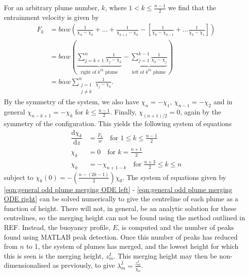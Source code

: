 \documentclass{jfm}
\newcommand{\dbyd}[2]{\dfrac{\mathrm{d} #1}{\mathrm{d}#2}} %
\begin{document}
	For an arbitrary plume number, $k$, where $1<k\leq \tfrac{n-1}{2}$ we find that the entrainment velocity is given by
	\begin{align}
	F_k &= b\alpha w \displaystyle{ \left(\frac{1}{\chi_n - \chi_k} + \dots + \frac{1}{\chi_{k+1} - \chi_k} - \left[\frac{1}{\chi_k - \chi_{k-1}} + \dots \frac{1}{\chi_k - \chi_1}\right]\right)}\\
	&= b\alpha w \left( \underbrace{\sum_{j=k+1}^{n} \frac{1}{\chi_j - \chi_k}}_{\text{right of $k^{th}$ plume}}  - \underbrace{\sum_{j=1}^{k-1}\frac{1}{\chi_k - \chi_j}}_{\text{left of $k^{th}$ plume}}\right) \label{eqn:general odd entrainment velocity} \\
	& = b\alpha w \sum_{\substack{j=1\\ j\neq k}}^{n} \frac{1}{\chi_j - \chi_k}. \label{eqn:general odd entrainment velocity concise}
	\end{align}
	By the symmetry of the system, we also have $\chi_n = -\chi_1$, $\chi_{n-1} = - \chi_2$ and in general $\chi_{n-k+1} = -\chi_k$ for $k \leq \frac{n-1}{2}$. Finally, $\chi_{(n+1)/2} = 0$, again by the symmetry of the configuration. This yields the following system of equations 
	\begin{align}
	\dbyd{\chi_k}{z} &= \frac{F_k}{w} \quad \text{for $1\leq k \leq \frac{n-1}{2}$} \label{eqn:general odd plume merging ODE left}\\
	\chi_k &= 0 \quad \text{for $k = \frac{n+1}{2}$} \label{eqn:general odd plume merging ODE centre} \\
	\chi_k &= -\chi_{n+1-k} \quad \text{for $\frac{n+3}{2}\leq k \leq n$}\label{eqn:general odd plume merging ODE right}
	\end{align}
	subject to $\chi_k(0) = -\left(\frac{n-(2k-1)}{2}\right)\chi_0$. 
	The system of equations given by \eqref{eqn:general odd plume merging ODE left} - \eqref{eqn:general odd plume merging ODE right} can be solved numerically to give the centreline of each plume as a function of height. There will not, in general, be an analytic solution for these centrelines, so the merging height can not be found using the method outlined in REF. Instead, the buoyancy profile, $E$, is computed and the number of peaks found using MATLAB peak detection. Once this number of peaks has reduced from $n$ to 1, the system of plumes has merged, and the lowest height for which this is seen is the merging height, $z_m^I$. This merging height may then be non-dimensionalised as previously, to give $\lambda_m^I = \frac{z_m^I}{\chi_0}$.\\
	
\end{document}

